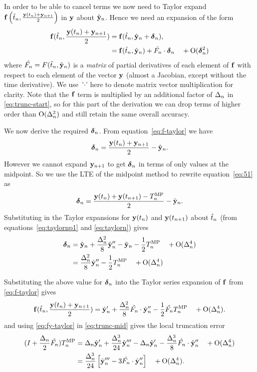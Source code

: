 In order to be able to cancel terms we now need to Taylor expand ${\mathbf{f}}\left( \hat{t}_{n}, \frac{\mathbf{y}(t_n) + \mathbf{y}_{n+1}}{2} \right)$ in $\mathbf{y}$ about $\hat{\mathbf{y}}_{n}$.
Hence we need an expansion of the form
\begin{align}
 {\mathbf{f}}(\hat{t}_{n}, \frac{\mathbf{y}(t_n) + \mathbf{y}_{n+1}}{2}) &= {\mathbf{f}}(\hat{t}_{n}, \hat{\mathbf{y}}_{n} + \mbox{\boldmath$\delta$}_{n}),
 \notag \\
 &= {\mathbf{f}}(\hat{t}_{n}, \hat{\mathbf{y}}_{n}) + \hat{F_{n}} \cdot \mbox{\boldmath$\delta$}_{n}  \quad + \text{O}(\mbox{\boldmath$\delta$}_{n}^2)
 \label{eq:f-taylor}
\end{align}
where $\hat{F_{n}} = F(\hat{t}_{n}, \hat{\mathbf{y}}_{n})$ is a \emph{matrix} of partial derivatives of each element of ${\mathbf{f}}$ with respect to each element of the vector $\mathbf{y}$ (\ie almost a Jacobian, except without the time derivative).
We use~'$\cdot$' here to denote matrix vector multiplication for clarity.
Note that the ${\mathbf{f}}$ term is multiplied by an additional factor of $\Delta_{n}$ in \eqref{eq:trunc-start}, so for this part of the derivation we can drop terms of higher order than $\text{O}(\Delta_{n}^2)$ and still retain the same overall accuracy.

We now derive the required $\mbox{\boldmath$\delta$}_{n}$.
From equation~\eqref{eq:f-taylor} we have
\begin{equation}
  \mbox{\boldmath$\delta$}_{n} = \frac{\mathbf{y}(t_n) + \mathbf{y}_{n+1}}{2} - \hat{\mathbf{y}}_{n}.
  \label{eq:51}
\end{equation}
However we cannot expand $\mathbf{y}_{n+1}$ to get $\mbox{\boldmath$\delta$}_{n}$ in terms of only values at the midpoint.
So we use the LTE of the midpoint method to rewrite equation~\eqref{eq:51} as
\begin{equation}
   \mbox{\boldmath$\delta$}_{n} = \frac{\mathbf{y}(t_n) + \mathbf{y}(t_{n+1}) - T_n^{\text{MP}}}{2} - \hat{\mathbf{y}}_{n}.
\end{equation}
Substituting in the Taylor expansions for $\mathbf{y}(t_n)$ and $\mathbf{y}(t_{n+1})$ about $\hat{t}_{n}$ (from equations~\eqref{eq:taylornp1} and \eqref{eq:taylorn}) gives
\begin{align}
  \mbox{\boldmath$\delta$}_{n} &= \hat{\mathbf{y}}_{n} + \frac{\Delta_{n}^2}{8} \hat{\mathbf{y}}_{n}'' - \hat{\mathbf{y}}_{n} - \frac{1}{2} T_n^{\text{MP}} \quad + \text{O}(\Delta_{n}^4) \notag\\
  &= \frac{\Delta_{n}^2}{8} \hat{\mathbf{y}}_{n}'' - \frac{1}{2} T_n^{\text{MP}} \quad + \text{O}(\Delta_{n}^4)
  \label{eq:dy-value}
\end{align}

Substituting the above value for $\mbox{\boldmath$\delta$}_{n}$ into the Taylor series expansion of ${\mathbf{f}}$ from \eqref{eq:f-taylor} gives
\begin{equation}
  {\mathbf{f}}(\hat{t}_{n}, \frac{\mathbf{y}(t_n) + \mathbf{y}_{n+1}}{2}) = \hat{\mathbf{y}}_{n}'
  + \frac{\Delta_{n}^2}{8} \hat{F_{n}} \cdot \hat{\mathbf{y}}_{n}'' - \frac{1}{2} \hat{F_{n}} T_n^{\text{MP}} \quad + \text{O}(\Delta_{n}^4)
  . \label{eq:fy-taylor}
\end{equation}
and using \eqref{eq:fy-taylor} in \eqref{eq:trunc-mid} gives the local truncation error
\begin{align}
  (I + \frac{\Delta_{n}}{2}\hat{F_{n}})T_n^{\text{MP}}
  &= \Delta_{n} \hat{\mathbf{y}}_{n}' + \frac{\Delta_{n}^3}{24} \hat{\mathbf{y}}_{n}'''
  - \Delta_{n} \hat{\mathbf{y}}_{n}'
  - \frac{\Delta_{n}^3}{8} \hat{F_{n}} \cdot \hat{\mathbf{y}}_{n}'' \quad + \text{O}(\Delta_{n}^4)
  \notag \\
  &= \frac{\Delta_{n}^3}{24} \left[\hat{\mathbf{y}}_{n}''' - 3 \hat{F_{n}} \cdot \hat{\mathbf{y}}_{n}'' \right]
  \quad + \text{O}(\Delta_{n}^4).
  \label{eq:trunc-implicit-form}
\end{align}

